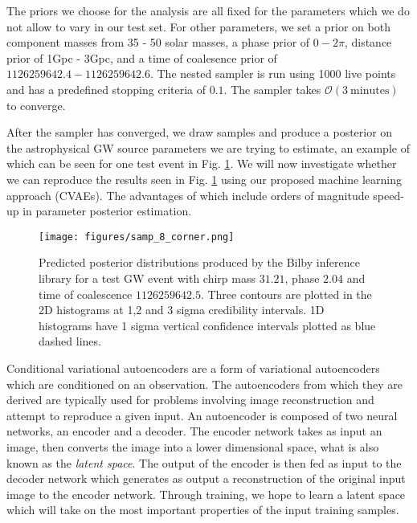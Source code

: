\documentclass{nature}
\begin{document}
%
%
The priors we choose for the analysis are all fixed for the parameters which we do not 
allow to vary in our test set. For other parameters, we set a prior on both component masses from 
35 - 50 solar masses, a phase prior of $0 - 2\pi$, distance prior of 1Gpc - 3Gpc, and 
a time of coalesence prior of $1126259642.4 - 1126259642.6$. The nested sampler is run 
using 1000 live points and has a predefined stopping criteria of $0.1$. The sampler takes 
$\mathcal{O}(3 \: \textrm{minutes})$ to converge.

%
% 
After the sampler has converged, we draw samples and produce a posterior on the 
astrophysical GW source parameters we are trying to estimate, an example of which 
can be seen for one test event in Fig. \ref{fig:bilby_pos_ex}. We will now investigate 
whether we can reproduce the results seen in Fig. \ref{fig:bilby_pos_ex} using our 
proposed machine learning approach (CVAEs). The advantages of which include orders 
of magnitude speed-up in parameter posterior estimation. 

\begin{figure}
    \centering
    \texttt{[image: figures/samp\_8\_corner.png]}
    \caption{Predicted posterior distributions produced by the Bilby 
    inference library for a test GW event with chirp mass $31.21$, 
    phase $2.04$ and time of coalescence $1126259642.5$. Three 
    contours are plotted in the 2D histograms at 1,2 and 3 sigma 
    credibility intervals. 1D histograms have 1 sigma vertical 
    confidence intervals plotted as blue dashed lines.}
    \label{fig:bilby_pos_ex}
\end{figure}
   

%
%
Conditional variational autoencoders are a form of variational autoencoders 
which are conditioned on an observation. The autoencoders from which they 
are derived are typically used 
for problems involving image reconstruction and attempt to reproduce a  
given input. An autoencoder is composed of two neural networks, an encoder 
and a decoder. The encoder network takes as input an image, then converts 
the image into a lower dimensional space, what is also known as the {\it{latent space}}. 
The output of the encoder is then fed as input to the decoder network 
which generates as output a reconstruction of the original input
image to the encoder network. Through training, we hope to learn a latent space which will 
take on the most important properties of the input training samples.  
\end{document}
